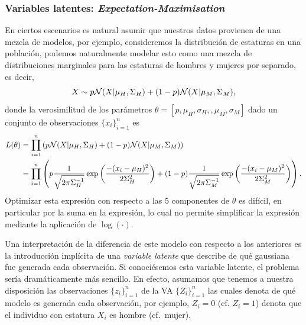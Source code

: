 \subsubsection{Variables latentes: \textit{Expectation-Maximisation}} 
\label{sub:EM}

En ciertos escenarios es natural asumir que nuestros datos provienen de una mezcla de modelos, por ejemplo, consideremos la distribución de estaturas en una población, podemos naturalmente modelar esto como una mezcla de distribuciones marginales para las estaturas de hombres y mujeres por separado, es decir, 
\begin{equation}
	X\sim p{\mathcal N}(X|\mu_H,\Sigma_H) + (1-p){\mathcal N}(X|\mu_M,\Sigma_M),
\end{equation}
donde la verosimilitud de los parámetros $\theta = [p, \mu_H, \sigma_H,, \mu_M, \sigma_M]$ dado un conjunto de observaciones $\{x_i\}_{i=1}^n$ es
\begin{align*}
	L(\theta) 	&= \prod_{i=1}^n \left( p{\mathcal N}(X|\mu_H,\Sigma_H) + (1-p){\mathcal N}(X|\mu_M,\Sigma_M) \right)\\
				&= \prod_{i=1}^n \left( p\frac{1}{\sqrt{2\pi\Sigma_H^{-1}}}\exp\left(\frac{-(x_i-\mu_H)^2}{2\Sigma^2_H}\right) + (1-p)\frac{1}{\sqrt{2\pi\Sigma_M^{-1}}}\exp\left(\frac{-(x_i-\mu_M)^2}{2\Sigma^2_M}\right)\right).
\end{align*}
Optimizar esta expresión con respecto a las 5 componentes de $\theta$ es difícil, en particular por la suma en la expresión, lo cual no permite simplificar la expresión mediante la aplicación de $\log(\cdot)$. 

Una interpretación de la diferencia de este modelo con respecto a los anteriores es la introducción implícita de una  \textit{variable latente} que describe de qué gaussiana fue generada cada observación. Si conociésemos esta variable latente, el problema sería dramáticamente más sencillo. En efecto, asumamos que tenemos a nuestra disposición las observaciones $\{z_i\}_{i=1}^n$ de la VA $\{Z_i\}_{i=1}^n$ las cuales denota de qué modelo es generada cada observación, por ejemplo, $Z_i=0$ (cf. $Z_i=1$) denota que el individuo con estatura $X_i$ es hombre (cf.~mujer).
 
